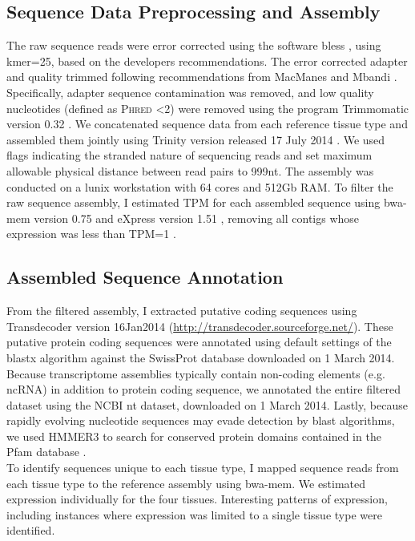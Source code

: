 \documentclass[11pt]{article}
\begin{document}
\subsection*{Sequence Data Preprocessing and Assembly}

The raw sequence reads were error corrected using the software bless \cite{Heo:2014cb}, using kmer=25, based on the developers recommendations. The error corrected adapter and quality trimmed following recommendations from MacManes \cite{MacManes:2014io} and Mbandi \cite{Christoffels:2014bg}. Specifically, adapter sequence contamination was removed, and low quality nucleotides (defined as \textsc{Phred} \textless 2) were removed using the program Trimmomatic version 0.32  \cite{Lohse:2012fg}. We concatenated sequence data from each reference tissue type and assembled them jointly using Trinity version released 17 July 2014 \cite{Haas:2013jq}. We used flags indicating the stranded nature of sequencing reads and set maximum allowable physical distance between read pairs to 999nt. The assembly was conducted on a lunix workstation with 64 cores and 512Gb RAM. To filter the raw sequence assembly, I estimated TPM for each assembled sequence using bwa-mem version 0.75 \cite{Li:2013wn} and eXpress version 1.51 \cite{Roberts:2012dh}, removing all contigs whose expression was less than TPM=1 \cite{Haas:2013jq}. \\

\subsection*{Assembled Sequence Annotation}

From the filtered assembly, I extracted putative coding sequences using Transdecoder version 16Jan2014 (\url{http://transdecoder.sourceforge.net/}). These putative protein coding sequences were annotated using default settings of the blastx algorithm \cite{Camacho:2009fc} against the SwissProt database downloaded on 1 March 2014. Because transcriptome assemblies typically contain non-coding elements (e.g. ncRNA) in addition to protein coding sequence, we annotated the entire filtered dataset using the NCBI nt dataset, downloaded on 1 March 2014. Lastly, because rapidly evolving nucleotide sequences may evade detection by blast algorithms, we used HMMER3 \cite{Wheeler:2013gj} to search for conserved protein domains contained in the Pfam database \cite{Punta:2012ko}. \\

To identify sequences unique to each tissue type, I mapped sequence reads from each tissue type to the reference assembly using bwa-mem. We estimated expression individually for the four tissues. Interesting patterns of expression, including instances where expression was limited to a single tissue type were identified. \\ 
\end{document}
